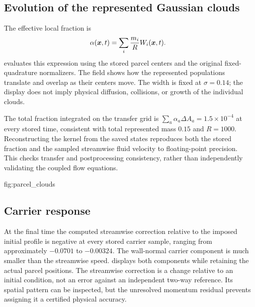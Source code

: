 
\subsection{Evolution of the represented Gaussian clouds}
The effective local fraction is
\begin{equation}
 \alpha(\bm{x},t)=\sum_i\frac{m_i}{R}W_i(\bm{x},t).
 \label{eq:cloud_fraction}
\end{equation}
 evaluates this expression using the stored parcel
centers and the original fixed-quadrature normalizers. The field shows
how the represented populations translate and overlap as their centers
move. The width is fixed at $\sigma=0.14$; the display does not imply
physical diffusion, collisions, or growth of the individual clouds.

The total fraction integrated on the transfer grid is
$\sum_a\alpha_a\Delta A_a=1.5\times10^{-4}$ at every stored time,
consistent with total represented mass $0.15$ and $R=1000$.
Reconstructing the kernel from the saved states reproduces both the stored
fraction and the sampled streamwise fluid velocity to floating-point
precision. This checks transfer and postprocessing consistency, rather
than independently validating the coupled flow equations.

{fig:parcel_clouds}

\subsection{Carrier response}
At the final time the computed streamwise correction relative to the
imposed initial profile is negative at every stored carrier sample, ranging
from approximately $-0.0701$ to $-0.00324$. The wall-normal carrier
component is much smaller than the streamwise speed.
 displays both components while retaining the
actual parcel positions. The streamwise correction is a change relative
to an initial condition, not an error against an independent two-way
reference. Its spatial pattern can be inspected, but the unresolved
momentum residual prevents assigning it a certified physical accuracy.

